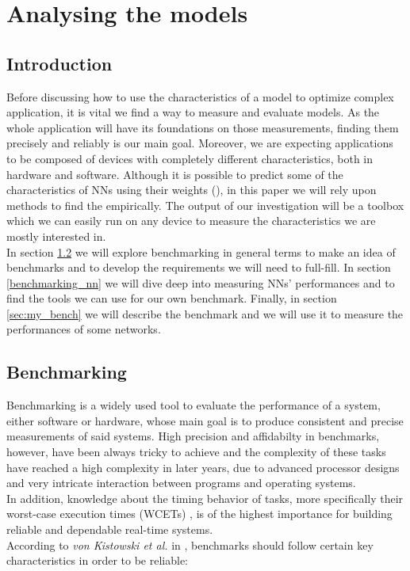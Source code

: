 \chapter{Analysing the models}\label{ana_models}
\section{Introduction}

Before discussing how to use the characteristics of a model to optimize complex application, it is vital we find a way to measure and evaluate models. As the whole application will have its foundations on those measurements, finding them precisely and reliably is our main goal. Moreover, we are expecting applications to be composed of devices with completely different characteristics, both in hardware and software. Although it is possible to predict some of the characteristics of NNs using their weights (\cite{Unterthiner2020PredictingNN}), in this paper we will rely upon methods to find the empirically. The output of our investigation will be a toolbox which we can easily run on any device to measure the characteristics we are mostly interested in. \\
In section \ref{benchmarking} we will explore benchmarking in general terms to make an idea of benchmarks and to develop the requirements we will need to full-fill. In section \ref{benchmarking_nn} we will dive deep into measuring NNs' performances and to find the tools we can use for our own benchmark. Finally, in section \ref{sec:my_bench} we will describe the benchmark and we will use it to measure the performances of some networks. 

\section{Benchmarking}\label{benchmarking}
Benchmarking is a widely used tool to evaluate the performance of a system, either software or hardware, whose main goal is to produce consistent and precise measurements of said systems. High precision and affidabilty in benchmarks, however, have been always tricky to achieve and the complexity of these tasks have reached a high complexity in later years, due to advanced processor designs and very intricate interaction between programs and operating systems.\cite{DBLP:journals/corr/abs-1811-01412}\\
In addition, knowledge about the timing behavior of tasks, more specifically their worst-case execution times (WCETs) , is of the highest importance for building reliable and dependable real-time systems.\cite{Real-Time-Systems}\\
According to \textit{von Kistowski et al.} in \cite{how_to_bench}, benchmarks should follow certain key characteristics in order to be reliable:


